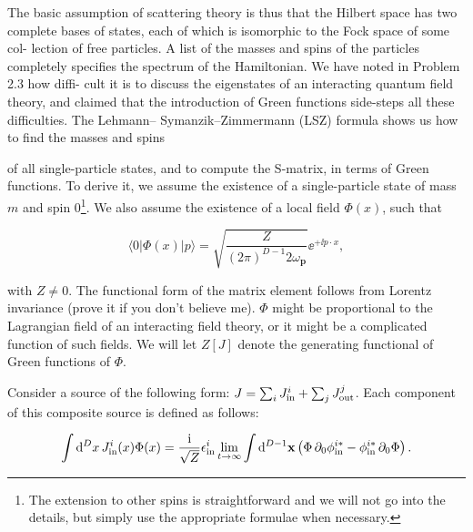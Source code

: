 The basic assumption of scattering theory is thus that the Hilbert space has two
complete bases of states, each of which is isomorphic to the Fock space of some col-
lection of free particles. A list of the masses and spins of the particles completely
specifies the spectrum of the Hamiltonian. We have noted in Problem 2.3 how diffi-
cult it is to discuss the eigenstates of an interacting quantum field theory, and claimed
that the introduction of Green functions side-steps all these difficulties. The Lehmann--
Symanzik--Zimmermann (LSZ) formula \cite{banks-ref-20} shows us how to find the masses and spins

of all single-particle states, and to compute the S-matrix, in terms of Green functions.
To derive it, we assume the existence of a single-particle state of mass $m$ and spin $0$\footnote[10]{The extension to other spins is straightforward and we will not go into the details, but simply use the appropriate formulae when necessary.}.
We also assume the existence of a local field $\Phi(x)$, such that

\[
\langle0|\Phi(x)|p\rangle=\sqrt{\frac{Z}{(2\pi)^{D-1} 2\omega_{\mathbf p}}}\ee^{+\ii p\mathbin{\cdot}x},
\]

with $Z\neq0$. The functional form of the matrix element follows from Lorentz invariance
(prove it if you don't believe me). $\Phi$ might be proportional to the Lagrangian field of
an interacting field theory, or it might be a complicated function of such fields. We will
let $Z[J]$ denote the generating functional of Green functions of $\Phi$.

Consider a source of the following form: $J=\sum_iJ^i_{\rm in}+\sum_jJ^j_{\rm out}$. Each component of
this composite source is defined as follows:

\[
\int\mathop{}\!\mathrm{d}^D x\,J^i_{\rm in}(x)\Phi(x)=\frac{\mathrm{i}}{\sqrt Z}\epsilon^i_{\rm in}\lim_{t\to\infty}\int\mathop{}\!\mathrm{d}^{D-1}\mathbf x\left(\Phi\,\partial_0\phi^{i*}_{\rm in}-\phi^{i*}_{\rm in}\,\partial_0\Phi\right).
\]

